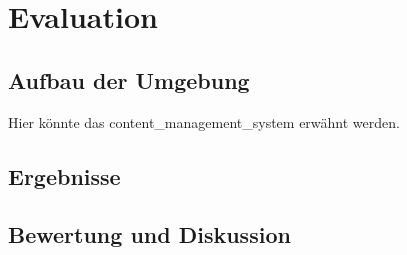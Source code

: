 \chapter{Evaluation}%
\section{Aufbau der Umgebung}
Hier könnte das \Gls{content_management_system} erwähnt werden.
\section{Ergebnisse}
\section{Bewertung und Diskussion}
